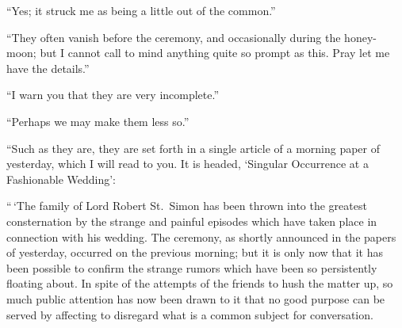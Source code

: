 “Yes; it struck me as being a little out of the common.”

“They often vanish before the ceremony, and occasionally
during the honey-moon; but I cannot call to mind anything
quite so prompt as this. Pray let me have the details.”

“I warn you that they are very incomplete.”

“Perhaps we may make them less so.”

“Such as they are, they are set forth in a single article of
a morning paper of yesterday, which I will read to you. It
is headed, ‘Singular Occurrence at a Fashionable
Wedding’:

“\,‘The family of Lord Robert St.~Simon has been thrown
into the greatest consternation by the strange and painful
episodes which have taken place in connection with his wedding.
The ceremony, as shortly announced in the papers of
yesterday, occurred on the previous morning; but it is only
now that it has been possible to confirm the strange rumors
which have been so persistently floating about. In spite of
the attempts of the friends to hush the matter up, so much
public attention has now been drawn to it that no good purpose
can be served by affecting to disregard what is a common
subject for conversation.

